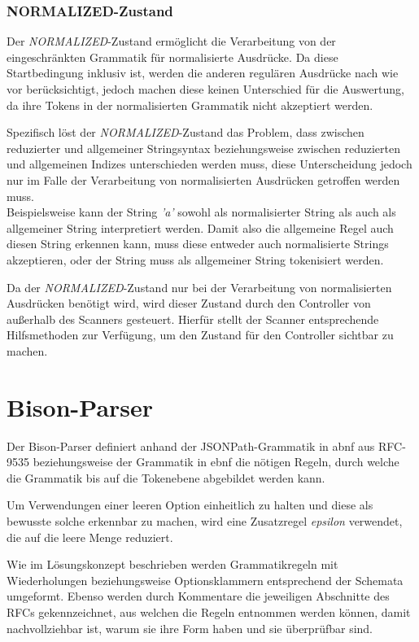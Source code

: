 \documentclass[oneside]{ausarbeitung}
\begin{document}
\subsubsection{NORMALIZED-Zustand}

Der \textit{NORMALIZED}-Zustand ermöglicht die Verarbeitung von der eingeschränkten Grammatik für normalisierte Ausdrücke. Da diese Startbedingung inklusiv ist, werden die anderen regulären Ausdrücke nach wie vor berücksichtigt, jedoch machen diese keinen Unterschied für die Auswertung, da ihre Tokens in der normalisierten Grammatik nicht akzeptiert werden. 

Spezifisch löst der \textit{NORMALIZED}-Zustand das Problem, dass zwischen reduzierter und allgemeiner Stringsyntax beziehungsweise zwischen reduzierten und allgemeinen Indizes unterschieden werden muss, diese Unterscheidung jedoch nur im Falle der Verarbeitung von normalisierten Ausdrücken getroffen werden muss. \\
Beispielsweise kann der String \textit{'a'} sowohl als normalisierter String als auch als allgemeiner String interpretiert werden. Damit also die allgemeine Regel auch diesen String erkennen kann, muss diese entweder auch normalisierte Strings akzeptieren, oder der String muss als allgemeiner String tokenisiert werden.

Da der \textit{NORMALIZED}-Zustand nur bei der Verarbeitung von normalisierten Ausdrücken benötigt wird, wird dieser Zustand durch den Controller von außerhalb des Scanners gesteuert. Hierfür stellt der Scanner entsprechende Hilfsmethoden zur Verfügung, um den Zustand für den Controller sichtbar zu machen.

	
	
	
		
\section{Bison-Parser}

Der Bison-Parser definiert anhand der JSONPath-Grammatik in \ac{abnf} aus RFC-9535 beziehungsweise der Grammatik in \ac{ebnf} die nötigen Regeln, durch welche die Grammatik bis auf die Tokenebene abgebildet werden kann.

Um Verwendungen einer leeren Option einheitlich zu halten und diese als bewusste solche erkennbar zu machen, wird eine Zusatzregel \textit{epsilon} verwendet, die auf die leere Menge reduziert.

Wie im Lösungskonzept beschrieben werden Grammatikregeln mit Wiederholungen beziehungsweise Optionsklammern entsprechend der Schemata umgeformt. Ebenso werden durch Kommentare die jeweiligen Abschnitte des RFCs gekennzeichnet, aus welchen die Regeln entnommen werden können, damit nachvollziehbar ist, warum sie ihre Form haben und sie überprüfbar sind. 
\end{document}
